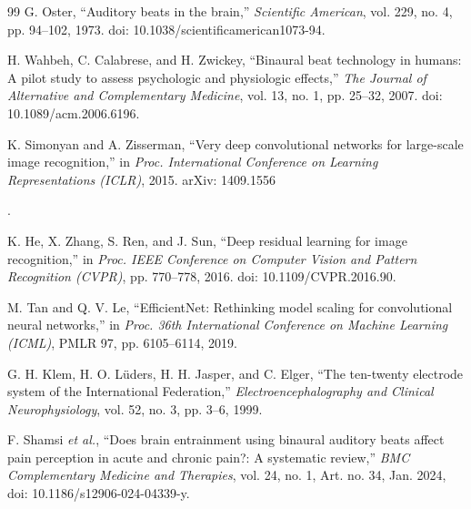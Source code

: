 \documentclass[12pt, a4paper]{report}
\begin{document}
\begin{thebibliography}{99}
G. Oster, ``Auditory beats in the brain,'' \textit{Scientific American}, vol. 229, no. 4, pp. 94--102, 1973. doi: 10.1038/scientificamerican1073-94.

H. Wahbeh, C. Calabrese, and H. Zwickey, ``Binaural beat technology in humans: A pilot study to assess psychologic and physiologic effects,'' \textit{The Journal of Alternative and Complementary Medicine}, vol. 13, no. 1, pp. 25--32, 2007. doi: 10.1089/acm.2006.6196.

K. Simonyan and A. Zisserman, ``Very deep convolutional networks for large-scale image recognition,'' in \textit{Proc. International Conference on Learning Representations (ICLR)}, 2015. arXiv: 1409.1556
        
        
        
        
        
        
        
        
        
        
        
        
        
        
        
        .

K. He, X. Zhang, S. Ren, and J. Sun, ``Deep residual learning for image recognition,'' in \textit{Proc. IEEE Conference on Computer Vision and Pattern Recognition (CVPR)}, pp. 770--778, 2016. doi: 10.1109/CVPR.2016.90.

M. Tan and Q. V. Le, ``EfficientNet: Rethinking model scaling for convolutional neural networks,'' in \textit{Proc. 36th International Conference on Machine Learning (ICML)}, PMLR 97, pp. 6105--6114, 2019.

G. H. Klem, H. O. L\"uders, H. H. Jasper, and C. Elger, ``The ten-twenty electrode system of the International Federation,'' \textit{Electroencephalography and Clinical Neurophysiology}, vol. 52, no. 3, pp. 3--6, 1999.



        
        
F. Shamsi \textit{et al.}, ``Does brain entrainment using binaural auditory beats affect pain perception in acute and chronic pain?: A systematic review,'' \textit{BMC Complementary Medicine and Therapies}, vol. 24, no. 1, Art. no. 34, Jan. 2024, doi: 10.1186/s12906-024-04339-y.



\end{thebibliography}
\end{document}
